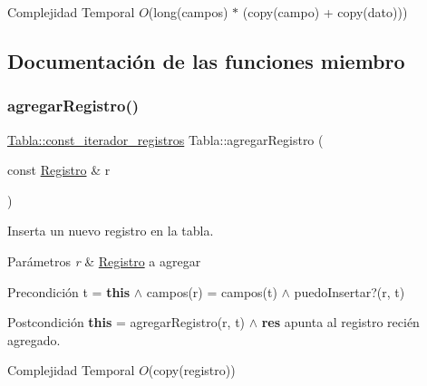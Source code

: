 \begin{DoxyDescription}
\item[Complejidad Temporal]$O$(long(campos) $\ast$ (copy(campo) + copy(dato)))
\end{DoxyDescription}

\subsection{Documentación de las funciones miembro}
\mbox{\label{classTabla_a99345e41702e7e9984732c6f3672e386}} 
\subsubsection{\texorpdfstring{agregar\+Registro()}{agregarRegistro()}}
{\footnotesize\ttfamily \mbox{\hyperlink{classTabla_1_1const__iterador__registros}{Tabla\+::const\+\_\+iterador\+\_\+registros}} Tabla\+::agregar\+Registro (\begin{DoxyParamCaption}\item[{const \mbox{\hyperlink{classRegistro}{Registro}} \&}]{r }\end{DoxyParamCaption})}



Inserta un nuevo registro en la tabla. 


\begin{DoxyParams}{Parámetros}
{\em r} & \mbox{\hyperlink{classRegistro}{Registro}} a agregar\\
\hline
\end{DoxyParams}
\begin{DoxyPrecond}{Precondición}
t = {\bfseries this} $\land$ campos(r) = campos(t) $\land$ puedo\+Insertar?(r, t) 
\end{DoxyPrecond}
\begin{DoxyPostcond}{Postcondición}
{\bfseries this} = agregar\+Registro(r, t) $\land$ {\bfseries res} apunta al registro recién agregado.
\end{DoxyPostcond}

\begin{DoxyDescription}
\item[Complejidad Temporal]$O$(copy(registro))
\end{DoxyDescription}\mbox{\label{classTabla_a9c9db2609fca7a928c12f423864dbe8d}} 

